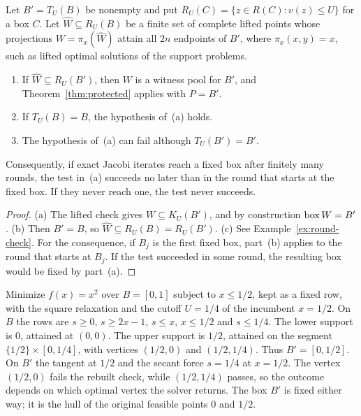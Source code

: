 \begin{proposition}\label{prop:round-check}
Let $B'=T_U(B)$ be nonempty and put
$R_U(C)=\{z\in R(C):v(z)\le U\}$ for a box $C$. Let
$\widehat W\subseteq R_U(B)$ be a finite set of complete lifted points
whose projections $W=\pi_x(\widehat W)$ attain all $2n$ endpoints of $B'$,
where $\pi_x(x,y)=x$, such as lifted optimal solutions of the support problems.
\begin{enumerate}[label=(\alph*)]
\item If $\widehat W\subseteq R_U(B')$, then $W$ is a witness pool for $B'$, and
  Theorem~\ref{thm:protected} applies with $P=B'$.
\item If $T_U(B)=B$, the hypothesis of~(a) holds.
\item The hypothesis of~(a) can fail although $T_U(B')=B'$.
\end{enumerate}
Consequently, if exact Jacobi iterates reach a fixed box after finitely
many rounds, the test in~(a) succeeds no later than in the round that
starts at the fixed box. If they never reach one, the test never
succeeds.
\end{proposition}
\begin{proof}
(a) The lifted check gives $W\subseteq K_U(B')$, and by construction
$\operatorname{box} W=B'$. (b) Then $B'=B$, so
$\widehat W\subseteq R_U(B)=R_U(B')$. (c) See Example~\ref{ex:round-check}. For the
consequence, if $B_j$ is the first fixed box, part~(b) applies to the
round that starts at $B_j$. If the test succeeded in some round, the
resulting box would be fixed by part~(a).
\end{proof}

\begin{example}\label{ex:round-check}
Minimize $f(x)=x^2$ over $B=[0,1]$ subject to $x\le1/2$, kept as a fixed
row, with the square relaxation and the cutoff $U=1/4$ of the incumbent
$x=1/2$. On $B$ the rows are $s\ge0$, $s\ge2x-1$, $s\le x$, $x\le1/2$ and
$s\le1/4$. The lower support is $0$, attained at $(0,0)$. The upper
support is $1/2$, attained on the segment $\{1/2\}\times[0,1/4]$, with
vertices $(1/2,0)$ and $(1/2,1/4)$. Thus $B'=[0,1/2]$. On $B'$ the tangent
at $1/2$ and the secant force $s=1/4$ at $x=1/2$. The vertex $(1/2,0)$
fails the rebuilt check, while $(1/2,1/4)$ passes, so the outcome depends
on which optimal vertex the solver returns. The box $B'$ is fixed either
way; it is the hull of the original feasible points $0$ and $1/2$.
\end{example}

